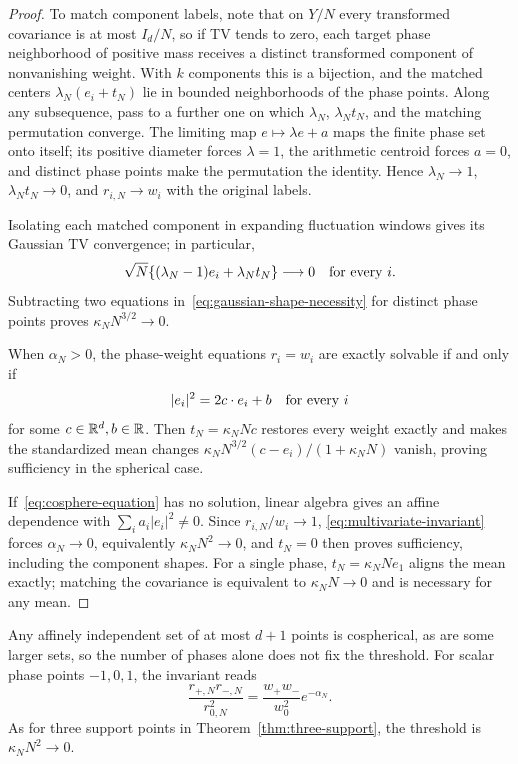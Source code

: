 \begin{proof}
To match component labels, note that on $Y/N$ every transformed
covariance is at most $I_d/N$, so if TV tends to zero, each target
phase neighborhood of positive mass receives a distinct transformed
component of nonvanishing weight. With $k$ components this is a
bijection, and the matched centers $\lambda_N(e_i+t_N)$ lie in
bounded neighborhoods of the phase points. Along any subsequence, pass
to a further one on which $\lambda_N$, $\lambda_Nt_N$, and the
matching permutation converge. The limiting map $e\mapsto\lambda e+a$
maps the finite phase set onto itself; its positive diameter forces
$\lambda=1$, the arithmetic centroid forces $a=0$, and distinct phase
points make the permutation the identity. Hence $\lambda_N\to1$,
$\lambda_Nt_N\to0$, and $r_{i,N}\to w_i$ with the original labels.

Isolating each matched component in expanding fluctuation windows
gives its Gaussian TV convergence; in particular,
\begin{equation}
 \sqrt N\{(\lambda_N-1)e_i+\lambda_Nt_N\}\longrightarrow0
 \quad\hbox{for every }i.
 \label{eq:gaussian-shape-necessity}
\end{equation}
Subtracting two equations in~\eqref{eq:gaussian-shape-necessity}
for distinct phase points proves $\kappa_NN^{3/2}\to0$.

When $\alpha_N>0$, the phase-weight equations $r_i=w_i$ are exactly
solvable if and only if
\begin{equation}
 |e_i|^2=2c\cdot e_i+b\quad\hbox{for every }i
 \label{eq:cosphere-equation}
\end{equation}
for some $c\in\mathbb R^d,b\in\mathbb R$. Then
$t_N=\kappa_NNc$ restores every weight exactly and makes the
standardized mean changes $\kappa_NN^{3/2}(c-e_i)/(1+\kappa_NN)$
vanish, proving sufficiency in the spherical case.

If~\eqref{eq:cosphere-equation} has no solution, linear algebra
gives an affine dependence with $\sum_i a_i|e_i|^2\ne0$. Since
$r_{i,N}/w_i\to1$, \eqref{eq:multivariate-invariant} forces
$\alpha_N\to0$, equivalently $\kappa_NN^2\to0$, and $t_N=0$ then
proves sufficiency, including the component shapes. For a single
phase, $t_N=\kappa_NNe_1$ aligns the mean exactly; matching the
covariance is equivalent to $\kappa_NN\to0$ and is necessary for any
mean.
\end{proof}

Any affinely independent set of at most $d+1$ points is cospherical,
as are some larger sets, so the number of phases alone does not fix
the threshold. For scalar phase points $-1,0,1$, the invariant reads
\begin{equation}
 \frac{r_{+,N}r_{-,N}}{r_{0,N}^2}
       =\frac{w_+w_-}{w_0^2}e^{-\alpha_N}.
 \label{eq:three-gaussian-invariant}
\end{equation}
As for three support points in Theorem~\ref{thm:three-support}, the
threshold is $\kappa_NN^2\to0$.

